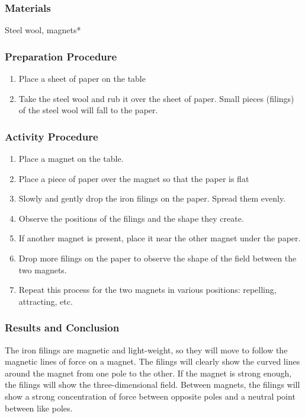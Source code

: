 \subsubsection*{Materials}
Steel wool, magnets*

\subsubsection*{Preparation Procedure}
\begin{enumerate}
\item{Place a sheet of paper on the table}
\item{Take the steel wool and rub it over the sheet of paper.  Small pieces (filings) of the steel wool will fall to the paper.}
\end{enumerate}

\subsubsection*{Activity Procedure}
\begin{enumerate}
\item{Place a magnet on the table.}
\item{Place a piece of paper over the magnet so that the paper is flat}
\item{Slowly and gently drop the iron filings on the paper.  Spread them evenly.}
\item{Observe the positions of the filings and the shape they create.}
\item{If another magnet is present, place it near the other magnet under the paper.}
\item{Drop more filings on the paper to observe the shape of the field between the two magnets.}
\item{Repeat this process for the two magnets in various positions: repelling, attracting, etc.}
\end{enumerate}

\subsubsection*{Results and Conclusion}
The iron filings are magnetic and light-weight, so they will move to follow the magnetic lines of force on a magnet.  The filings will clearly show the curved lines around the magnet from one pole to the other.  If the magnet is strong enough, the filings will show the three-dimensional field.
Between magnets, the filings will show a strong concentration of force between opposite poles and a neutral point between like poles.

